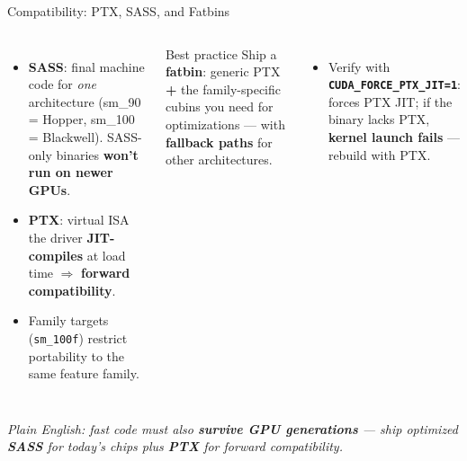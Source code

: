 \documentclass[aspectratio=169]{beamer}
\newcommand{\kw}[1]{\textbf{\textcolor{kwblue}{#1}}}
\newcommand{\pe}[1]{\par{\setlength{\fboxsep}{2.5pt}\noindent\colorbox{navy!9}{\parbox{\dimexpr\textwidth-5pt\relax}{\footnotesize\itshape Plain English: #1}}}}
\begin{document}
\begin{frame}{Compatibility: PTX, SASS, and Fatbins}
  \begin{columns}[t]
    \begin{itemize}
      \item \kw{SASS}: final machine code for \emph{one} architecture (sm\_90 = Hopper,
            sm\_100 = Blackwell). SASS-only binaries \kw{won't run on newer GPUs}.
      \item \kw{PTX}: virtual ISA the driver \kw{JIT-compiles} at load time $\Rightarrow$
            \kw{forward compatibility}.
      \item Family targets (\texttt{sm\_100f}) restrict portability to the same feature family.
    \end{itemize}
    \begin{block}{Best practice}
      \small Ship a \kw{fatbin}: generic PTX \kw{+} the family-specific cubins you need for
      optimizations --- with \kw{fallback paths} for other architectures.
    \end{block}
    \begin{itemize}\small
      \item Verify with \kw{\texttt{CUDA\_FORCE\_PTX\_JIT=1}}: forces PTX JIT;
            if the binary lacks PTX, \kw{kernel launch fails} --- rebuild with PTX.
    \end{itemize}
  \end{columns}
  \pe{fast code must also \kw{survive GPU generations} --- ship optimized \kw{SASS} for today's chips plus \kw{PTX} for forward compatibility.}
\end{frame}
\end{document}

